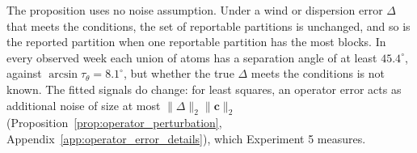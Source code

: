 \begin{remark}
The proposition uses no noise assumption.  Under a wind or dispersion error \(\Delta\) that meets
the conditions, the set of reportable partitions is unchanged, and so is the reported
partition when one reportable partition has the most blocks.  In every observed week
each union of atoms has a separation angle of at least \(45.4^\circ\), against
\(\arcsin\tau_\theta=8.1^\circ\), but whether the true \(\Delta\) meets the conditions is not
known.
The fitted signals do change: for least squares, an operator error acts as additional
noise of size at most \(\|\Delta\|_2\|\mathbf c\|_2\)
(Proposition~\ref{prop:operator_perturbation}, Appendix~\ref{app:operator_error_details}),
which Experiment 5 measures.
\end{remark}
